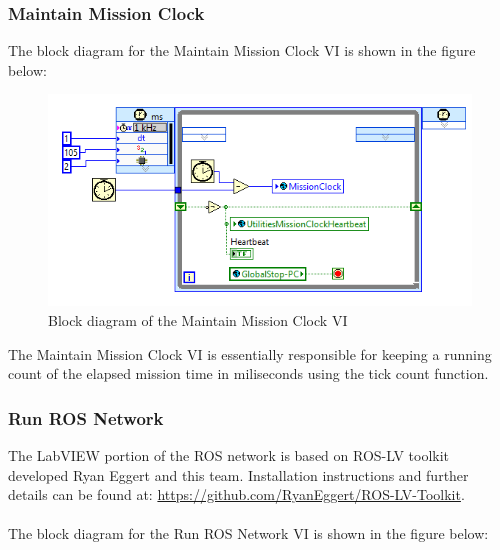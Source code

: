 \subsubsection{Maintain Mission Clock}

The block diagram for the Maintain Mission Clock VI is shown in the figure below:

\begin{figure}[h!]
\centering
\includegraphics[scale=0.85]{Photos/maintainmissionclock.png}
\caption{Block diagram of the Maintain Mission Clock VI}
\label{fig:maintainmissionclock}
\end{figure}

\noindent The Maintain Mission Clock VI is essentially responsible for keeping a running count of the elapsed mission time in miliseconds using the tick count function. 

\newpage

\subsubsection{Run ROS Network}

The LabVIEW portion of the ROS network is based on ROS-LV toolkit developed Ryan Eggert and this team. Installation instructions and further details can be found at: \url{https://github.com/RyanEggert/ROS-LV-Toolkit}.\\ \\
%
The block diagram for the Run ROS Network VI is shown in the figure below:

